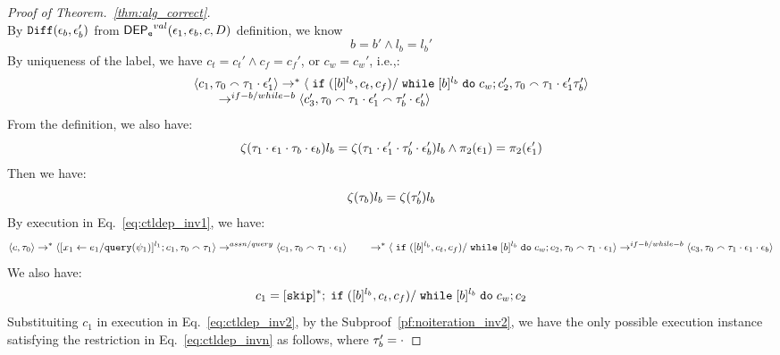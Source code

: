\begin{proof}[Proof of Theorem.~\ref{thm:alg_correct}]
\[ \]
 By $\mathtt{Diff}(\mathtt{\epsilon}_b,\mathtt{\epsilon}_b' )$ from $\mathsf{DEP_{\mathtt{e}}}^{val}(\mathtt{\epsilon}_1, \mathtt{\epsilon}_b, c, D)$ definition, we know
 \[
 b = b' \land l_b = l_b'
 \]
 By uniqueness of the label, we have $c_t = c_t' \land c_f = c_f'$, or $c_w = c_w'$, i.e.,:
 \begin{equation}
\label{eq:ctldep_inv2}
  \begin{array}{l}   
\langle c_1, \mathtt{\tau}_0 \smallfrown \mathtt{\tau}_1 \cdot \mathtt{\epsilon}_1' \rangle 
  \rightarrow^{*} 
  \langle \;\mathtt{if}\;([b]{}^{l_b}, c_t, c_f) / \;\mathtt{while}\; [b]{}^{l_b} \;\mathtt{do}\; c_w; {c}_2',
   \mathtt{\tau}_0 \smallfrown \mathtt{\tau}_1 \cdot \mathtt{\epsilon}_1' \mathtt{\tau}_b' \rangle 
   \\ \qquad
  \rightarrow^{if-b / while-b} 
  \langle {c}_3',  \mathtt{\tau}_0 \smallfrown \mathtt{\tau}_1 \cdot \mathtt{\epsilon}_1' \smallfrown \mathtt{\tau}_b' \cdot \mathtt{\epsilon}_b' \rangle 
\end{array}
\end{equation}
%
From the definition, we also have:
\[
  \mathtt{\zeta}(\mathtt{\tau}_1 \cdot \mathtt{\epsilon}_1 \cdot \mathtt{\tau}_b\cdot \mathtt{\epsilon}_b) l_b
= 
\mathtt{\zeta}(\mathtt{\tau}_1 \cdot \mathtt{\epsilon}_1' \cdot \mathtt{\tau}_b'\cdot \mathtt{\epsilon}_b') l_b
\land 
\pi_2(\mathtt{\epsilon}_1) = \pi_2(\mathtt{\epsilon}_1')
\]
%
Then we have:
 \begin{equation}
\label{eq:ctldep_invn}
  \mathtt{\zeta}(\mathtt{\tau}_b) l_b = \mathtt{\zeta}(\mathtt{\tau}_b') l_b
\end{equation}
 By execution in Eq.~\ref{eq:ctldep_inv1}, we have:
\[
\langle {c}, \mathtt{\tau}_0 \rangle \rightarrow^{*} 
\langle [\mathrel{ {x}_1 \leftarrow e_1 / {\tt query}(\psi_1) }]^{l_1} ; {c}_1, \mathtt{\tau}_0 \smallfrown \mathtt{\tau}_1 \rangle  
\rightarrow^{assn/query}
 \langle c_1, \mathtt{\tau}_0 \smallfrown \mathtt{\tau}_1 \cdot \mathtt{\epsilon}_1 \rangle 
 \\ \qquad 
 \rightarrow^{*} 
  \langle \;\mathtt{if}\;([b]{}^{l_b}, c_t, c_f) / \;\mathtt{while}\; [b]{}^{l_b} \;\mathtt{do}\; c_w; {c}_2, 
  \mathtt{\tau}_0 \smallfrown \mathtt{\tau}_1 \cdot \mathtt{\epsilon}_1 \rangle 
  \rightarrow^{if-b / while-b} 
  \langle {c}_3,  \mathtt{\tau}_0 \smallfrown \mathtt{\tau}_1 \cdot \mathtt{\epsilon}_1 \cdot \mathtt{\epsilon}_b \rangle 
 \]
 We also have:
 \[
 c_1 = [\mathtt{skip}]^*;\;\mathtt{if}\;([b]{}^{l_b}, c_t, c_f) / \;\mathtt{while}\; [b]{}^{l_b} \;\mathtt{do}\; c_w; {c}_2
 \]
Substituiting $c_1$ in execution in Eq.~\ref{eq:ctldep_inv2}, by the Subproof~\ref{pf:noiteration_inv2}, 
we have the only possible execution instance satisfying 
the restriction in Eq.~\ref{eq:ctldep_invn} as follows, where $\mathtt{\tau}_b' = \cdot$

\end{proof}
